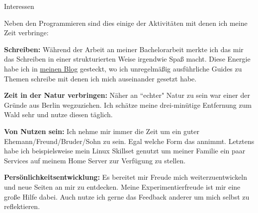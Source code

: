 \documentclass{cv}
\begin{document}
\begin{rSection}{Interessen}

  Neben den Programmieren sind dies einige der Aktivitäten mit denen ich meine Zeit verbringe:

  {\bf Schreiben:}
  Während der Arbeit an meiner Bachelorarbeit merkte ich das mir das Schreiben
  in einer strukturierten Weise irgendwie Spaß macht.
  Diese Energie habe ich in \href{https://jneidel.com/blog/}{meinen Blog}
  gesteckt, wo ich unregelmäßig ausführliche Guides zu Themen schreibe mit denen
  ich mich auseinander gesetzt habe.

  {\bf Zeit in der Natur verbringen:}
  Näher an ``echter" Natur zu sein war einer der Gründe aus Berlin wegzuziehen.
  Ich schätze meine drei-minütige Entfernung zum Wald sehr und nutze diesen täglich.

  {\bf Von Nutzen sein:}
  Ich nehme mir immer die Zeit um ein guter Ehemann/Freund/Bruder/Sohn zu sein.
  Egal welche Form das annimmt.
  Letztens habe ich beispielsweise mein Linux Skillset genutzt um meiner Familie
  ein paar Services auf meinem Home Server zur Verfügung zu stellen.

  {\bf Persönlichkeitsentwicklung:}
  Es bereitet mir Freude mich weiterzuentwickeln und neue Seiten an mir zu entdecken.
  Meine Experimentierfreude ist mir eine große Hilfe dabei.
  Auch nutze ich gerne das Feedback anderer um mich selbst zu reflektieren.

\end{rSection}
\end{document}
